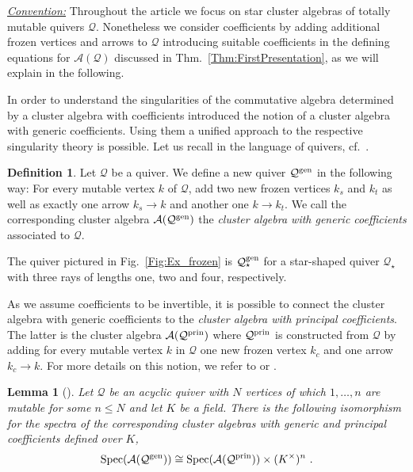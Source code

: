\documentclass[letter,11pt]{amsart}
\DeclareMathOperator{\Spec}{Spec}
\newcommand{\gen}{{\rm gen}}
\newcommand{\prin}{{\rm prin}}
\newcommand{\cA}{\mathcal{A}}
\newcommand{\cQ}{\mathcal{Q}}
\theoremstyle{theorem}
\newtheorem{lemma}[Thm]{Lemma}
\theoremstyle{definition}
\newtheorem{defi}[Thm]{Definition} %
\numberwithin{equation}{section}
\begin{document}
\underline{\em Convention:}
Throughout the article we focus on star cluster algebras of totally mutable quivers $ \cQ $. 
Nonetheless we consider coefficients by adding additional frozen vertices and arrows to $ \cQ $ introducing suitable coefficients in the defining equations for $ \cA (\cQ) $ discussed in Thm.~\ref{Thm:FirstPresentation}, 
as we will explain in the following.


In order to understand the singularities of the commutative algebra determined by a cluster algebra with coefficients 
\cite{BFMS25} introduced the notion of a cluster algebra with generic coefficients.
Using them a unified approach to the respective singularity theory is possible. 
Let us recall \cite[Def.~3.2.1]{BFMS25} in the language of quivers, cf.~\cite[Rk.~3.2.2.(4)]{BFMS25}. 


\begin{defi}
	\label{Def:gen_coeff}
	Let $ \cQ $ be a quiver.
	We define a new quiver $ \cQ^\gen $ in the following way: 
	For every mutable vertex $ k $ of $ \cQ $, 
	add two new frozen vertices $ k_s $ and $ k_t $ as well as exactly one arrow $ k_s \rightarrow k $ and another one $ k \to k_t $. 
	We call the corresponding cluster algebra $ \cA(\cQ^\gen) $ the 
	{\em cluster algebra with generic coefficients} associated to $ \cQ $. 
\end{defi}

The quiver pictured in Fig.~\ref{Fig:Ex_frozen} is $ \cQ_\star^\gen $ for a star-shaped quiver $ \cQ_\star $ with 
three rays of lengths one, two and four, respectively. 


As we assume coefficients to be invertible,
it is possible to connect the cluster algebra with generic coefficients to the {\em cluster algebra with principal coefficients}. 
The latter is the cluster algebra $ \cA(\cQ^\prin) $
where $ \cQ^\prin $ is constructed from $ \cQ $ by adding for every mutable vertex $ k $ in $ \cQ $ one new frozen vertex $ k_c $ and one arrow $ k_c \to k $. 
For more details on this notion, we refer to \cite[Def.~3.1 and Rk.~3.2]{FZ2007}
or \cite[Sec.~4.1]{INT_complexes}.


\begin{lemma}[{\cite[Lemma~3.3.2]{BFMS25}}]
	\label{Lem:prin}
	Let $ \cQ $ be an acyclic quiver with $ N $ vertices of which $ 1, \ldots, n $ are mutable for some $ n \leq N $ and let $ K $ be a field. 
	There is the following isomorphism for the 
	spectra of the
	corresponding cluster algebras with generic and principal coefficients defined over $ K $, 
	\[
		\Spec(\cA ( \cQ^\gen ) ) \cong \Spec (\cA ( \cQ^\prin ) ) \times (K^\times)^n  
		\ .
	\]
\end{lemma}
\end{document}
